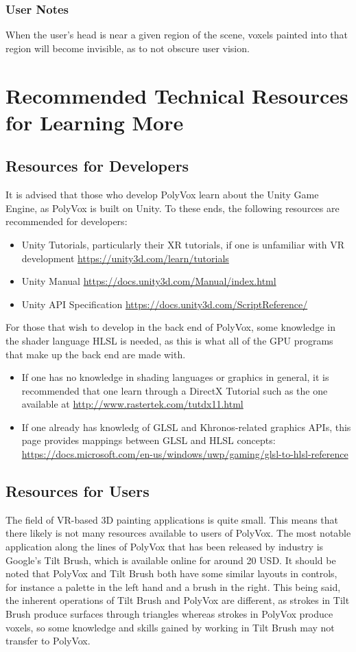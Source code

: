 \documentclass[onecolumn, draftclsnofoot,10pt, compsoc]{IEEEtran}
\begin{document}
\subsubsection{User Notes}
When the user's head is near a given region of the scene, voxels painted into that region will become invisible, as to not obscure user vision.



\section{Recommended Technical Resources for Learning More}
\subsection{Resources for Developers}
It is advised that those who develop PolyVox learn about the Unity Game Engine, as PolyVox is built on Unity. To these ends, the following resources are recommended for developers:
\begin{itemize}
\item Unity Tutorials, particularly their XR tutorials, if one is unfamiliar with VR development \url{https://unity3d.com/learn/tutorials}
\item Unity Manual \url{https://docs.unity3d.com/Manual/index.html}
\item Unity API Specification \url{https://docs.unity3d.com/ScriptReference/}
\end{itemize}

For those that wish to develop in the back end of PolyVox, some knowledge in the shader language HLSL is needed, as this is what all of the GPU programs that make up the back end are made with.
\begin{itemize}
\item If one has no knowledge in shading languages or graphics in general, it is recommended that one learn through a DirectX Tutorial such as the one available at \url{http://www.rastertek.com/tutdx11.html}
\item If one already has knowledg of GLSL and Khronos-related graphics APIs, this page provides mappings between GLSL and HLSL concepts: \url{https://docs.microsoft.com/en-us/windows/uwp/gaming/glsl-to-hlsl-reference}
\end{itemize}


\subsection{Resources for Users}
The field of VR-based 3D painting applications is quite small.
This means that there likely is not many resources available to users of PolyVox.
The most notable application along the lines of PolyVox that has been released by industry is Google’s Tilt Brush, which is available online for around 20 USD.
It should be noted that PolyVox and Tilt Brush both have some similar layouts in controls, for instance a palette in the left hand and a brush in the right.
This being said, the inherent operations of Tilt Brush and PolyVox are different, as strokes in Tilt Brush produce surfaces through triangles whereas strokes in PolyVox produce voxels, so some knowledge and skills gained by working in Tilt Brush may not transfer to PolyVox.
\end{document}
